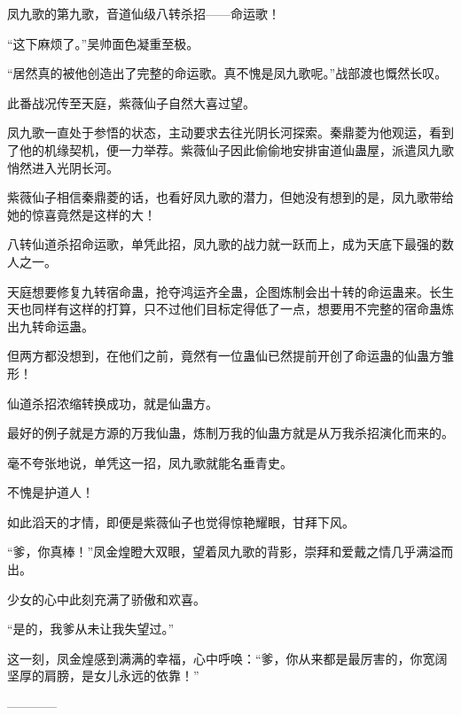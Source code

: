 \begin{this_body}
凤九歌的第九歌，音道仙级八转杀招——命运歌！

“这下麻烦了。”吴帅面色凝重至极。

“居然真的被他创造出了完整的命运歌。真不愧是凤九歌呢。”战部渡也慨然长叹。

此番战况传至天庭，紫薇仙子自然大喜过望。

凤九歌一直处于参悟的状态，主动要求去往光阴长河探索。秦鼎菱为他观运，看到了他的机缘契机，便一力举荐。紫薇仙子因此偷偷地安排宙道仙蛊屋，派遣凤九歌悄然进入光阴长河。

紫薇仙子相信秦鼎菱的话，也看好凤九歌的潜力，但她没有想到的是，凤九歌带给她的惊喜竟然是这样的大！

八转仙道杀招命运歌，单凭此招，凤九歌的战力就一跃而上，成为天底下最强的数人之一。

天庭想要修复九转宿命蛊，抢夺鸿运齐全蛊，企图炼制会出十转的命运蛊来。长生天也同样有这样的打算，只不过他们目标定得低了一点，想要用不完整的宿命蛊炼出九转命运蛊。

但两方都没想到，在他们之前，竟然有一位蛊仙已然提前开创了命运蛊的仙蛊方雏形！

仙道杀招浓缩转换成功，就是仙蛊方。

最好的例子就是方源的万我仙蛊，炼制万我的仙蛊方就是从万我杀招演化而来的。

毫不夸张地说，单凭这一招，凤九歌就能名垂青史。

不愧是护道人！

如此滔天的才情，即便是紫薇仙子也觉得惊艳耀眼，甘拜下风。

“爹，你真棒！”凤金煌瞪大双眼，望着凤九歌的背影，崇拜和爱戴之情几乎满溢而出。

少女的心中此刻充满了骄傲和欢喜。

“是的，我爹从未让我失望过。”

这一刻，凤金煌感到满满的幸福，心中呼唤：“爹，你从来都是最厉害的，你宽阔坚厚的肩膀，是女儿永远的依靠！”

------------

\end{this_body}

